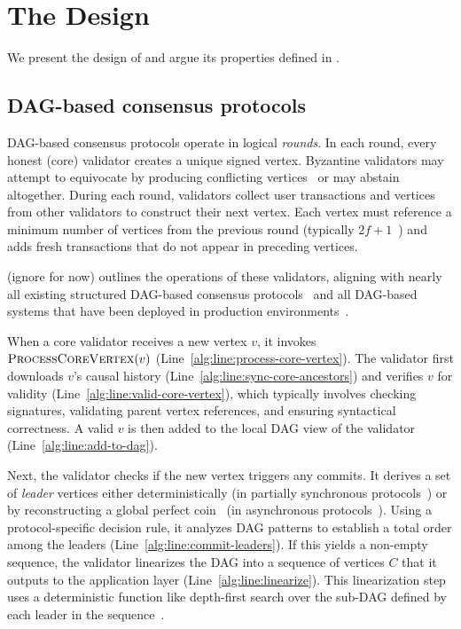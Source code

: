 \section{The \sysname Design} \label{sec:design}

We present the design of \sysname and argue its properties defined in .

\subsection{DAG-based consensus protocols} \label{sec:dag}

DAG-based consensus protocols operate in logical \emph{rounds}. In each round, every honest (core) validator creates a unique signed vertex. Byzantine validators may attempt to equivocate by producing conflicting vertices~\cite{dag-rider} or may abstain altogether. During each round, validators collect user transactions and vertices from other validators to construct their next vertex. Each vertex must reference a minimum number of vertices from the previous round (typically $2f + 1$~\cite{narwhal,bullshark,mysticeti}) and adds fresh transactions that do not appear in preceding vertices.

 (ignore  for now) outlines the operations of these validators, aligning with nearly all existing structured DAG-based consensus protocols~\cite{narwhal,bullshark,shoal,shoal++,mysticeti,dag-rider,dumbo-ng,dispersedledger,sailfish,bbca-chain,fino,gradeddag,cordial-miners,wahoo,lightdag,dai2024remora} and all DAG-based systems that have been deployed in production environments~\cite{narwhal,bullshark,mysticeti,hammerhead}.

When a core validator receives a new vertex $v$, it invokes $\Call{ProcessCoreVertex}{v}$ (Line~\ref{alg:line:process-core-vertex}). The validator first downloads $v$'s causal history (Line~\ref{alg:line:sync-core-ancestors}) and verifies $v$ for validity (Line~\ref{alg:line:valid-core-vertex}), which typically involves checking signatures, validating parent vertex references, and ensuring syntactical correctness. A valid $v$ is then added to the local DAG view of the validator (Line~\ref{alg:line:add-to-dag}).

Next, the validator checks if the new vertex triggers any commits. It derives a set of \emph{leader} vertices either deterministically (in partially synchronous protocols~\cite{bullshark,shoal,mysticeti}) or by reconstructing a global perfect coin~\cite{abraham2023bingo} (in asynchronous protocols~\cite{narwhal,cordial-miners}). Using a protocol-specific decision rule, it analyzes DAG patterns to establish a total order among the leaders (Line~\ref{alg:line:commit-leaders}). If this yields a non-empty sequence, the validator linearizes the DAG into a sequence of vertices $C$ that it outputs to the application layer (Line~\ref{alg:line:linearize}). This linearization step uses a deterministic function like depth-first search over the sub-DAG defined by each leader in the sequence~\cite{dag-rider,narwhal,bullshark}.

